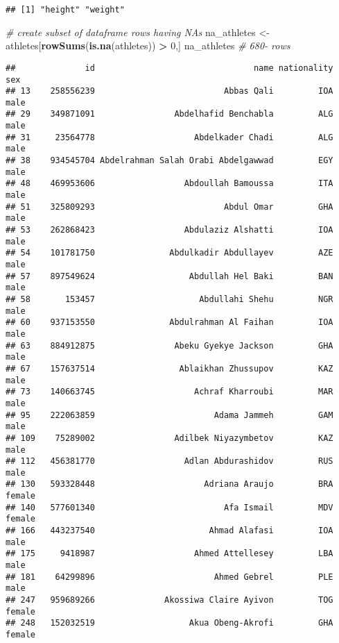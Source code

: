 \documentclass[]{article}
\newenvironment{Shaded}{\begin{snugshade}}{\end{snugshade}}
\newcommand{\CommentTok}[1]{\textcolor[rgb]{0.56,0.35,0.01}{\textit{#1}}}
\newcommand{\DecValTok}[1]{\textcolor[rgb]{0.00,0.00,0.81}{#1}}
\newcommand{\KeywordTok}[1]{\textcolor[rgb]{0.13,0.29,0.53}{\textbf{#1}}}
\newcommand{\NormalTok}[1]{#1}
\newcommand{\OperatorTok}[1]{\textcolor[rgb]{0.81,0.36,0.00}{\textbf{#1}}}
\newcommand{\StringTok}[1]{\textcolor[rgb]{0.31,0.60,0.02}{#1}}
\begin{document}
\begin{verbatim}
## [1] "height" "weight"
\end{verbatim}

\begin{Shaded}
\begin{Highlighting}[]
    \CommentTok{#  create subset of dataframe rows having NAs}
\NormalTok{    na_athletes <-}\StringTok{ }\NormalTok{athletes[}\KeywordTok{rowSums}\NormalTok{(}\KeywordTok{is.na}\NormalTok{(athletes)) }\OperatorTok{>}\StringTok{ }\DecValTok{0}\NormalTok{,]}
\NormalTok{    na_athletes }\CommentTok{# 680- rows}
\end{Highlighting}
\end{Shaded}

\begin{verbatim}
##              id                                name nationality    sex
## 13    258556239                          Abbas Qali         IOA   male
## 29    349871091                Abdelhafid Benchabla         ALG   male
## 31     23564778                    Abdelkader Chadi         ALG   male
## 38    934545704 Abdelrahman Salah Orabi Abdelgawwad         EGY   male
## 48    469953606                  Abdoullah Bamoussa         ITA   male
## 51    325809293                          Abdul Omar         GHA   male
## 53    262868423                  Abdulaziz Alshatti         IOA   male
## 54    101781750               Abdulkadir Abdullayev         AZE   male
## 57    897549624                   Abdullah Hel Baki         BAN   male
## 58       153457                     Abdullahi Shehu         NGR   male
## 60    937153550               Abdulrahman Al Faihan         IOA   male
## 63    884912875                Abeku Gyekye Jackson         GHA   male
## 67    157637514                 Ablaikhan Zhussupov         KAZ   male
## 73    140663745                    Achraf Kharroubi         MAR   male
## 95    222063859                        Adama Jammeh         GAM   male
## 109    75289002                Adilbek Niyazymbetov         KAZ   male
## 112   456381770                  Adlan Abdurashidov         RUS   male
## 130   593328448                      Adriana Araujo         BRA female
## 140   577601340                          Afa Ismail         MDV female
## 166   443237540                       Ahmad Alafasi         IOA   male
## 175     9418987                    Ahmed Attellesey         LBA   male
## 181    64299896                        Ahmed Gebrel         PLE   male
## 247   959689266              Akossiwa Claire Ayivon         TOG female
## 248   152032519                   Akua Obeng-Akrofi         GHA female

\end{verbatim}
\end{document}
